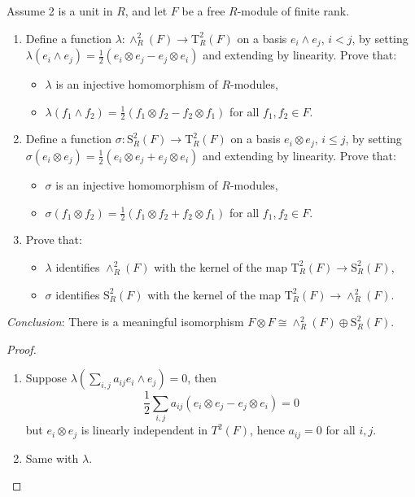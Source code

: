 \documentclass[openany]{book}
\newcommand{\tensor}{\otimes} %
\newcommand{\lambdaprod}{\wedge} %
\newcommand{\T}{\text{T}} %
\newcommand{\Ssq}{\text{S}}
\begin{document}
    
    \begin{prob}[4.9]
    Assume 2 is a unit in \( R \), and let \( F \) be a free \( R \)-module of finite rank.
    \begin{enumerate}
        \item Define a function \( \lambda : \lambdaprod^2_R(F) \rightarrow \T^2_R(F) \) on a basis \( e_i \lambdaprod e_j, \, i < j \), by setting \( \lambda(e_i \lambdaprod e_j) = \frac{1}{2}(e_i \tensor e_j - e_j \tensor e_i) \) and extending by linearity. Prove that:
        \begin{itemize}
            \item \( \lambda \) is an injective homomorphism of \( R \)-modules,
            \item \( \lambda(f_1 \lambdaprod f_2) = \frac{1}{2}(f_1 \tensor f_2 - f_2 \tensor f_1) \) for all \( f_1, f_2 \in F \).
        \end{itemize}
        
        \item Define a function \( \sigma : \Ssq^2_R(F) \rightarrow \T^2_R(F) \) on a basis \( e_i \tensor e_j, \, i \leq j \), by setting \( \sigma(e_i \tensor e_j) = \frac{1}{2}(e_i \tensor e_j + e_j \tensor e_i) \) and extending by linearity. Prove that:
        \begin{itemize}
            \item \( \sigma \) is an injective homomorphism of \( R \)-modules,
            \item \( \sigma(f_1 \tensor f_2) = \frac{1}{2}(f_1 \tensor f_2 + f_2 \tensor f_1) \) for all \( f_1, f_2 \in F \).
        \end{itemize}
        
        \item Prove that:
        \begin{itemize}
            \item \( \lambda \) identifies \( \lambdaprod^2_R(F) \) with the kernel of the map \( \T^2_R(F) \rightarrow \Ssq^2_R(F) \),
            \item \( \sigma \) identifies \( \Ssq^2_R(F) \) with the kernel of the map \( \T^2_R(F) \rightarrow \lambdaprod^2_R(F) \).
        \end{itemize}
    \end{enumerate}
    \textit{Conclusion}: There is a meaningful isomorphism \( F \tensor F \cong \lambdaprod^2_R(F) \oplus \Ssq^2_R(F) \).
    \end{prob}
\begin{proof}
    \begin{enumerate}
        \item Suppose $\lambda\left(\sum_{i,j}a_{ij}e_i\wedge e_j\right)=0$, then 
        \begin{equation*}
            \frac{1}{2}\sum_{i,j}a_{ij}\left(e_i\otimes e_j-e_j\otimes e_i\right)=0
        \end{equation*}
        but $e_i\otimes e_j$ is linearly independent in $T^2(F)$, hence $a_{ij}=0$ for all $i,j$.
        \item Same with $\lambda$.
    \end{enumerate}
\end{proof}
\end{document}

